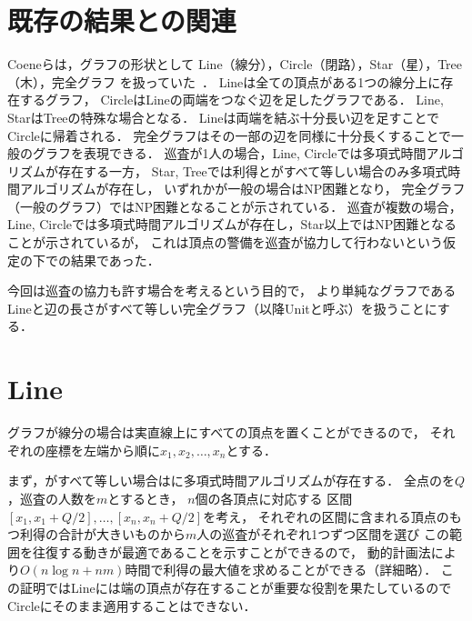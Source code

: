 \section{既存の結果との関連}

Coeneらは，グラフの形状として
Line（線分），Circle（閉路），Star（星），Tree（木），完全グラフ
を扱っていた~\cite{coene2011charlemagne}．
Lineは全ての頂点がある1つの線分上に存在するグラフ，
CircleはLineの両端をつなぐ辺を足したグラフである．
%
Line, StarはTreeの特殊な場合となる．
Lineは両端を結ぶ十分長い辺を足すことでCircleに帰着される．
完全グラフはその一部の辺を同様に十分長くすることで一般のグラフを表現できる．
%
巡査が1人の場合，Line, Circleでは多項式時間アルゴリズムが存在する一方，
Star, Treeでは利得と{\timelimit}がすべて等しい場合のみ多項式時間アルゴリズムが存在し，
いずれかが一般の場合はNP困難となり，
完全グラフ（一般のグラフ）ではNP困難となることが示されている．
%
巡査が複数の場合，
Line, Circleでは多項式時間アルゴリズムが存在し，Star以上ではNP困難となることが示されているが，
これは頂点の警備を巡査が協力して行わないという仮定の下での結果であった．
%

今回は巡査の協力も許す場合を考えるという目的で，
より単純なグラフであるLineと辺の長さがすべて等しい完全グラフ（以降Unitと呼ぶ）を扱うことにする．
%


\section{Line}

グラフが線分の場合は実直線上にすべての頂点を置くことができるので，
それぞれの座標を左端から順に$x_1, x_2, \ldots, x_n$とする．



まず，{\timelimit}がすべて等しい場合は{\optpp}に多項式時間アルゴリズムが存在する．
%
全点の{\timelimit}を$Q$，巡査の人数を$m$とするとき，
$n$個の各頂点に対応する
区間$[x_1, x_1 + Q/2], \ldots, [x_n, x_n + Q/2]$を考え，
それぞれの区間に含まれる頂点のもつ利得の合計が大きいものから$m$人の巡査がそれぞれ1つずつ区間を選び
この範囲を往復する動きが最適であることを示すことができるので，
動的計画法により$O(n \log n + nm)$時間で利得の最大値を求めることができる（詳細略）．
%
この証明ではLineには端の頂点が存在することが重要な役割を果たしているので
Circleにそのまま適用することはできない．



